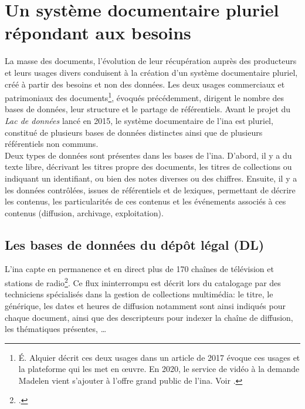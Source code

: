 \section{\label{I-B-2}Un système documentaire pluriel répondant aux besoins}

La masse des documents, l'évolution de leur récupération auprès des producteurs et leurs usages divers conduisent à la création d'un système documentaire pluriel, créé à partir des besoins et non des données. Les deux usages commerciaux et patrimoniaux des documents\footnote{É. Alquier décrit ces deux usages dans un article de 2017 évoque ces usages et la plateforme qui les met en œuvre. En 2020, le service de vidéo à la demande Madelen vient s'ajouter à l'offre \og grand public\fg{} de l'\ac{ina}. Voir \cite{alquier_production_2017}.}, évoqués précédemment, dirigent le nombre des bases de données, leur structure et le partage de référentiels. Avant le projet du \textit{Lac de données} lancé en 2015, le système documentaire de l'\ac{ina} est pluriel, constitué de plusieurs bases de données distinctes ainsi que de plusieurs référentiels non communs.\\

Deux types de données sont présentes dans les bases de l'\ac{ina}. D'abord, il y a du texte libre, décrivant les titres propre des documents, les titres de collections ou indiquant un identifiant, ou bien des notes diverses ou des chiffres. Ensuite, il y a les données contrôlées, issues de référentiels et de lexiques, permettant de décrire les contenus, les particularités de ces contenus et les événements associés à ces contenus (diffusion, archivage, exploitation).

\subsection{\label{I-B-2-a}Les bases de données du dépôt légal (DL)}

L'\ac{ina} capte en permanence et en direct plus de 170 chaînes de télévision et stations de radio\footcite[p.5]{institut_national_de_laudiovisuel_rapport_2019}. Ce flux ininterrompu est décrit lors du catalogage par des techniciens spécialisés dans la gestion de collections multimédia: le titre, le générique, les dates et heures de diffusion notamment sont ainsi indiqués pour chaque document, ainsi que des descripteurs pour indexer la chaîne de diffusion, les thématiques présentes, \dots\\

